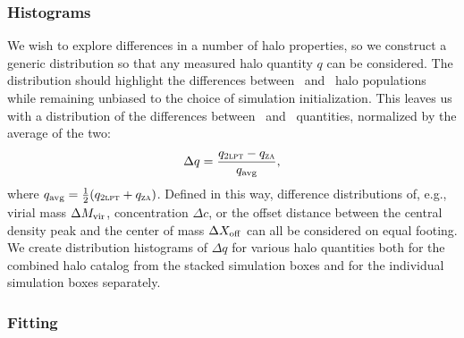 \subsubsection{Histograms}
\label{subsubsec:analysis--difference_histograms--binning}


We wish to explore differences in a number of halo properties, so we construct a generic distribution so that any measured halo quantity $q$ can be considered.  The distribution should  highlight the differences between \lpt\ and \za\ halo populations while remaining unbiased to the choice of simulation initialization.  This leaves us with a distribution of the differences between \lpt\ and \za\ quantities, normalized by the average of the two:
\begin{equation} \label{eq:delta_q}
	\Delta q = \frac{q_{\textsc{2lpt}} - q_{\textsc{za}}}{q_{\mathrm{avg}}},
\end{equation}
where $q_{\mathrm{avg}} = \frac{1}{2} (q_{\textsc{2lpt}} + q_{\textsc{za}})$.  Defined in this way, difference distributions of, e.g.,  virial mass $\Delta {M_{\mathrm{vir}}}$, concentration $\Delta c$, or the offset distance between the central density peak and the center of mass $\Delta {X_{\mathrm{off}}}$ can all be considered on equal footing.  We create distribution histograms of $\Delta q$ for various halo quantities both for the combined halo catalog from the stacked simulation boxes and for the individual simulation boxes separately.


\subsubsection{Fitting}
\label{subsubsec:analysis--difference_histograms--fitting}


